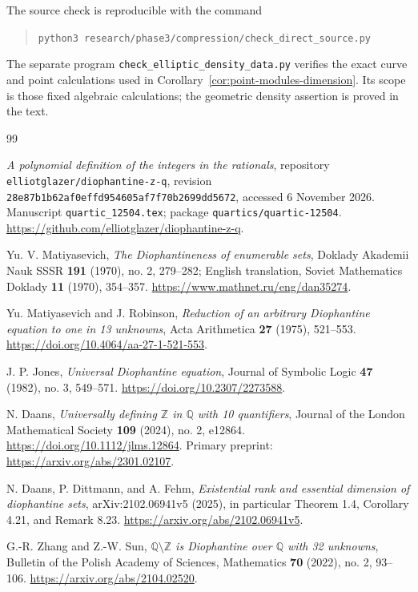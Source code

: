 \documentclass[11pt]{article}
\theoremstyle{definition}
\newcommand{\Q}{\mathbb Q}
\newcommand{\Z}{\mathbb Z}
\begin{document}
The source check is reproducible with the command
\begin{quote}
\nolinkurl{python3 research/phase3/compression/check_direct_source.py}
\end{quote}
The separate program \texttt{check\_elliptic\_density\_data.py}
verifies the exact curve and point calculations used in
Corollary~\ref{cor:point-modules-dimension}.  Its scope is those
fixed algebraic calculations; the geometric density assertion is
proved in the text.


\begin{thebibliography}{99}

\emph{A polynomial definition of the integers in the rationals},
repository \texttt{elliotglazer/diophantine-z-q}, revision
\nolinkurl{28e87b1b62af0effd954605af7f70b2699dd5672}, accessed
6 November 2026. Manuscript \texttt{quartic\_12504.tex}; package
\texttt{quartics/quartic-12504}.
\url{https://github.com/elliotglazer/diophantine-z-q}.


Yu. V. Matiyasevich, \emph{The Diophantineness of enumerable sets},
Doklady Akademii Nauk SSSR \textbf{191} (1970), no. 2, 279--282;
English translation, Soviet Mathematics Doklady \textbf{11} (1970),
354--357. \url{https://www.mathnet.ru/eng/dan35274}.

Yu. Matiyasevich and J. Robinson, \emph{Reduction of an arbitrary
Diophantine equation to one in 13 unknowns}, Acta Arithmetica
\textbf{27} (1975), 521--553.
\url{https://doi.org/10.4064/aa-27-1-521-553}.

J. P. Jones, \emph{Universal Diophantine equation}, Journal of Symbolic
Logic \textbf{47} (1982), no. 3, 549--571.
\url{https://doi.org/10.2307/2273588}.

N. Daans, \emph{Universally defining $\Z$ in $\Q$ with 10 quantifiers},
Journal of the London Mathematical Society \textbf{109} (2024), no. 2,
e12864. \url{https://doi.org/10.1112/jlms.12864}.
Primary preprint: \url{https://arxiv.org/abs/2301.02107}.

N. Daans, P. Dittmann, and A. Fehm, \emph{Existential rank and
essential dimension of diophantine sets}, arXiv:2102.06941v5 (2025),
in particular Theorem 1.4, Corollary 4.21, and Remark 8.23.
\url{https://arxiv.org/abs/2102.06941v5}.

G.-R. Zhang and Z.-W. Sun, \emph{$\Q\setminus\Z$ is Diophantine
over $\Q$ with 32 unknowns}, Bulletin of the Polish Academy of Sciences,
Mathematics \textbf{70} (2022), no. 2, 93--106.
\url{https://arxiv.org/abs/2104.02520}.


\end{thebibliography}
\end{document}
